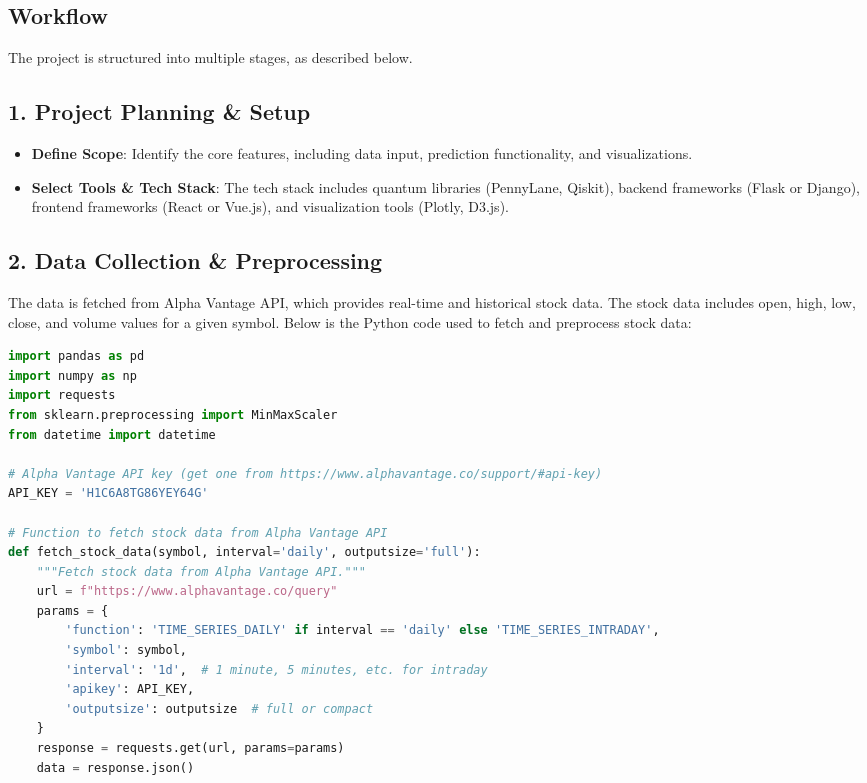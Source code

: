 \documentclass[12pt]{article}
\begin{document}
\begin{multicols}{2}
\section{Workflow}
The project is structured into multiple stages, as described below.

\subsection{1. Project Planning \& Setup}
\begin{itemize}
    \item \textbf{Define Scope}: Identify the core features, including data input, prediction functionality, and visualizations.
    \item \textbf{Select Tools \& Tech Stack}: The tech stack includes quantum libraries (PennyLane, Qiskit), backend frameworks (Flask or Django), frontend frameworks (React or Vue.js), and visualization tools (Plotly, D3.js).
\end{itemize}

\subsection{2. Data Collection \& Preprocessing}
The data is fetched from Alpha Vantage API, which provides real-time and historical stock data. The stock data includes open, high, low, close, and volume values for a given symbol. Below is the Python code used to fetch and preprocess stock data:

\begin{lstlisting}[language=Python, caption=Fetching and Preprocessing Stock Data]
import pandas as pd
import numpy as np
import requests
from sklearn.preprocessing import MinMaxScaler
from datetime import datetime

# Alpha Vantage API key (get one from https://www.alphavantage.co/support/#api-key)
API_KEY = 'H1C6A8TG86YEY64G'

# Function to fetch stock data from Alpha Vantage API
def fetch_stock_data(symbol, interval='daily', outputsize='full'):
    """Fetch stock data from Alpha Vantage API."""
    url = f"https://www.alphavantage.co/query"
    params = {
        'function': 'TIME_SERIES_DAILY' if interval == 'daily' else 'TIME_SERIES_INTRADAY',
        'symbol': symbol,
        'interval': '1d',  # 1 minute, 5 minutes, etc. for intraday
        'apikey': API_KEY,
        'outputsize': outputsize  # full or compact
    }
    response = requests.get(url, params=params)
    data = response.json()


\end{lstlisting}
\end{multicols}
\end{document}
